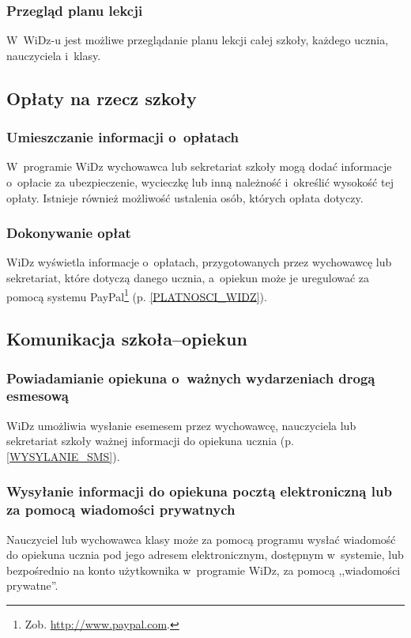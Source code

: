 \documentclass[12pt,leqno,twoside]{mwart}
\begin{document}
\subsubsection{Przegląd planu lekcji}
\noindent W~WiDz-u jest możliwe przeglądanie planu lekcji całej szkoły, każdego ucznia, nauczyciela i~klasy.

\subsection{Opłaty na rzecz szkoły}
\subsubsection{Umieszczanie informacji o~opłatach}
\noindent W~programie WiDz wychowawca lub sekretariat szkoły mogą dodać informacje o~opłacie za ubezpieczenie, wycieczkę lub inną należność i~określić wysokość tej opłaty. Istnieje również możliwość ustalenia osób, których opłata dotyczy.

\subsubsection{Dokonywanie opłat}
\noindent WiDz wyświetla informacje o~opłatach, przygotowanych przez wychowawcę lub sekretariat, które dotyczą danego ucznia, a~opiekun może je uregulować za pomocą systemu PayPal\footnote{Zob. \url{http://www.paypal.com}.} (p. \ref{PLATNOSCI_WIDZ}). 

\subsection{Komunikacja szkoła--opiekun}
\subsubsection{Powiadamianie opiekuna o~ważnych wydarzeniach drogą esmesową}
\noindent WiDz umożliwia wysłanie esemesem przez wychowawcę, nauczyciela lub sekretariat szkoły ważnej informacji do opiekuna ucznia  (p. \ref{WYSYLANIE_SMS}).

\subsubsection{Wysyłanie informacji do opiekuna pocztą elektroniczną lub za pomocą wiadomości prywatnych}
\noindent Nauczyciel lub wychowawca klasy może za pomocą programu wysłać wiadomość do opiekuna ucznia pod jego adresem elektronicznym, dostępnym w~systemie, lub bezpośrednio na konto użytkownika w~programie WiDz, za pomocą ,,wiadomości prywatne''.
\end{document}
